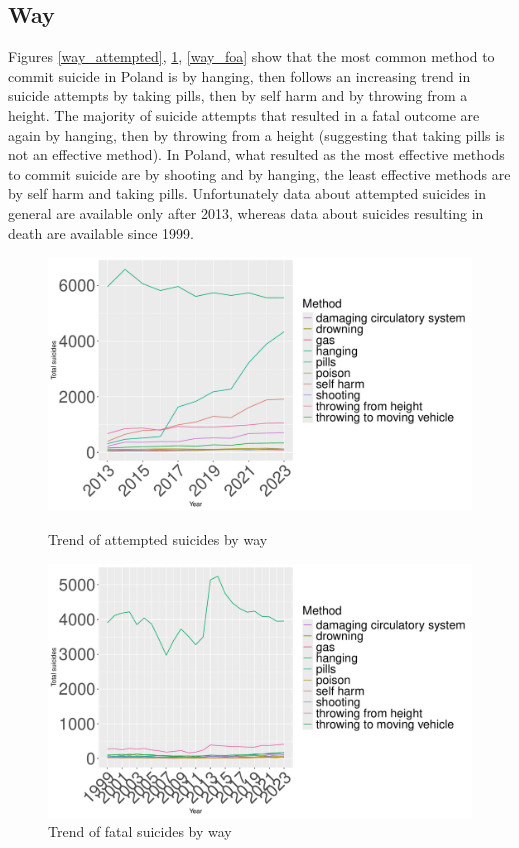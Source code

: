 \documentclass{article}
\begin{document}
\subsection{Way}
Figures \ref{way_attempted}, \ref{way_fatal}, \ref{way_foa}
show that the most common method to commit suicide in Poland is by hanging,
then follows an increasing trend in suicide attempts by taking pills,
then by self harm and by throwing from a height.
The majority of suicide attempts that resulted in a fatal outcome are 
again by hanging, then by throwing from a height (suggesting that taking pills
is not an effective method).
In Poland, what resulted as the most effective methods to commit suicide
are by shooting and by hanging, the least effective methods are by self harm
and taking pills.
Unfortunately data about attempted suicides in general are available only after 2013,
whereas data about suicides resulting in death are available since 1999. 
\begin{figure}[H]
    \centering
    \begin{minipage}{0.65\textwidth}
        \includegraphics[width=\textwidth]{imgs/way_attempted.pdf}
        \caption{Trend of attempted suicides by way }
	\label{way_attempted}
    \end{minipage}
    \hfill
    \begin{minipage}{0.65\textwidth}
        \includegraphics[width=\textwidth]{imgs/way_fatal.pdf}
        \caption{Trend of fatal suicides by way }
	\label{way_fatal}
    \end{minipage}
\end{figure}
\end{document}
